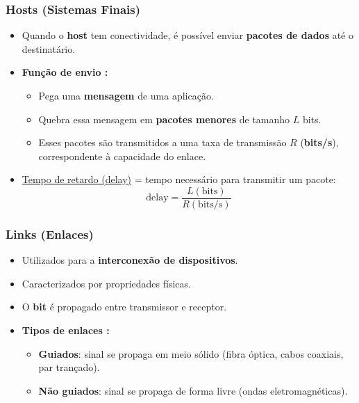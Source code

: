     \subsubsection*{Hosts (Sistemas Finais)}
    \begin{itemize}[left=0.5cm, align=left, nosep]
        \item Quando o \textbf{host} tem conectividade, é possível enviar \textbf{pacotes de dados} até o destinatário.
        
        \item \textbf{Função de envio :} 
        \begin{itemize}[left=0.5cm, nosep, label=$\hookrightarrow$]
            \item Pega uma \textbf{mensagem} de uma aplicação.
            \item Quebra essa mensagem em \textbf{pacotes menores} de tamanho $L$ bits.
            \item Esses pacotes são transmitidos a uma taxa de transmissão $R$ (\textbf{bits/s}), correspondente à capacidade do enlace.
        \end{itemize}      
        
        \item \underline{Tempo de retardo (delay)} = tempo necessário para transmitir um pacote:  
        \[
        \text{delay} = \frac{L (\text{bits})}{R (\text{bits/s})}
        \]
    \end{itemize}

    \subsubsection*{Links (Enlaces)}
    \begin{itemize}[left=0.5cm, align=left, nosep]
        \item Utilizados para a \textbf{interconexão de dispositivos}.
        \item Caracterizados por propriedades físicas.
        \item O \textbf{bit} é propagado entre transmissor e receptor.
        
        \item \textbf{Tipos de enlaces :}
        \begin{itemize}[left=0.5cm, nosep, label=$\hookrightarrow$]
            \item \textbf{Guiados}: sinal se propaga em meio sólido (fibra óptica, cabos coaxiais, par trançado).
            \item \textbf{Não guiados}: sinal se propaga de forma livre (ondas eletromagnéticas). 
        \end{itemize}     
    \end{itemize}

